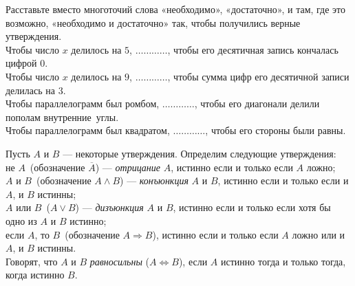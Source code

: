 \documentclass[a4paper,11pt]{article}
\newcommand{\0}[1]{\overline{#1}}
\begin{document}




 Расставьте вместо многоточий слова «необходимо», «достаточно», и там, где это возможно, «необходимо и достаточно» так, чтобы получились верные утверждения.\\
 Чтобы число $x$ делилось на $5$, $\ldots\ldots\ldots\ldots$, чтобы его десятичная запись кончалась цифрой $0$.\\
 Чтобы число $x$ делилось на $9$, $\ldots\ldots\ldots\ldots$, чтобы сумма цифр его десятичной записи делилась на $3$.\\
 Чтобы параллелограмм был ромбом, $\ldots\ldots\ldots\ldots$, чтобы его диагонали делили пополам внутренние~углы.\\
 Чтобы параллелограмм был квадратом, $\ldots\ldots\ldots\ldots$, чтобы его стороны были равны.

Пусть  $A$ и $B$ --- некоторые утверждения. Определим
следующие утверждения:\\
 не $A$\ (обозначение $\overline A$) --- %
{\it отрицание\/} $A$, истинно если и только если $A$ ложно;\\
 $A$ и $B$\ (обозначение $A\wedge B$) --- %
{\it конъюнкция\/} %
$A$ и $B$, истинно если и только если и $A$, и $B$ истинны; \\
 $A$ или $B$\ ($A\vee B$) --- %
{\it дизъюнкция\/} %
$A$ и $B$,
истинно если и только если хотя бы одно из $A$ и $B$ истинно; \\
 если $A$, то $B$\ (обозначение $A\Rightarrow B$), %
истинно если и только если $A$ ложно или и $A$, и $B$ истинны.\\
Говорят, что $A$ и $B$ {\em равносильны} ($A\Leftrightarrow B$), если $A$ истинно тогда и только тогда, когда истинно $B$.
\end{document}
